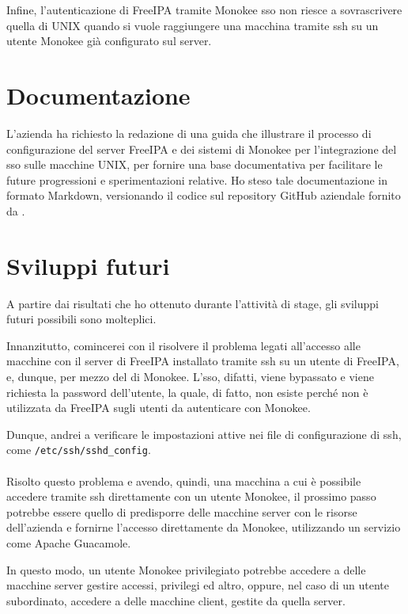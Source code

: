 Infine, l'autenticazione di FreeIPA tramite Monokee \acrshort{sso} non riesce a sovrascrivere quella di UNIX quando si vuole raggiungere una macchina tramite \acrshort{ssh} su un utente Monokee già configurato sul server. 

\section{Documentazione}

L'azienda ha richiesto la redazione di una guida che illustrare il processo di configurazione del server FreeIPA e dei sistemi di Monokee per l'integrazione del \acrshort{sso} sulle macchine UNIX, per fornire una base documentativa per facilitare le future progressioni e sperimentazioni relative. Ho steso tale documentazione in formato Markdown, versionando il codice sul repository GitHub aziendale fornito da \myAzienda\cite{site:docs}.
\section{Sviluppi futuri}
A partire dai risultati che ho ottenuto durante l'attività di stage, gli sviluppi futuri possibili sono molteplici.

Innanzitutto, comincerei con il risolvere il problema legati all'accesso alle macchine con il server di FreeIPA installato tramite \acrshort{ssh} su un utente di FreeIPA, e, dunque, per mezzo del  di Monokee. L'\acrshort{sso}, difatti, viene bypassato e viene richiesta la password dell'utente, la quale, di fatto, non esiste perché non è utilizzata da FreeIPA sugli utenti da autenticare con Monokee. 

Dunque, andrei a verificare le impostazioni attive nei file di configurazione di \acrshort{ssh}, come \texttt{/etc/ssh/sshd\_config}.
\\ \\
Risolto questo problema e avendo, quindi, una macchina a cui è possibile accedere tramite \acrshort{ssh} direttamente con un utente Monokee, il prossimo passo potrebbe essere quello di predisporre delle macchine server con le risorse dell'azienda e fornirne l'accesso 
direttamente da Monokee, utilizzando un servizio come Apache Guacamole.

In questo modo, un utente Monokee privilegiato potrebbe accedere a delle macchine server gestire accessi, privilegi ed altro, oppure, nel caso di un utente subordinato, accedere a delle macchine client, gestite da quella server.